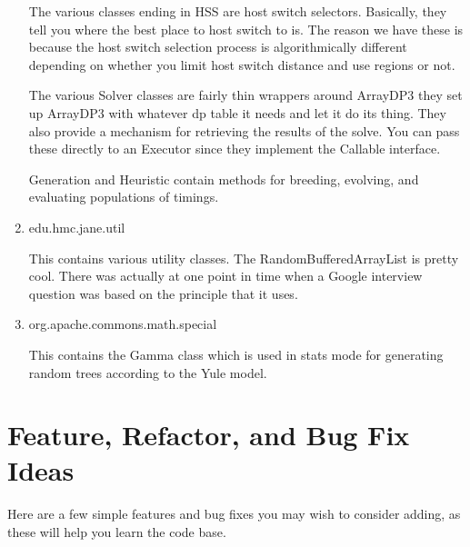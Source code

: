 \documentclass{article}
\begin{document}
\begin{enumerate}
The various classes ending in HSS are host switch selectors. Basically, they tell you where the best place to host switch to is. The reason we have these is because the host switch selection process is algorithmically different depending on whether you limit host switch distance and use regions or not. 

The various Solver classes are fairly thin wrappers around ArrayDP3 they set up ArrayDP3 with whatever dp table it needs and let it do its thing. They also provide a mechanism for retrieving the results of the solve. You can pass these directly to an Executor since they implement the Callable interface.

Generation and Heuristic contain methods for breeding, evolving, and evaluating populations of timings.

\item edu.hmc.jane.util

This contains various utility classes. The RandomBufferedArrayList is pretty cool. There was actually at one point in time when a Google interview question was based on the principle that it uses.

\item org.apache.commons.math.special

This contains the Gamma class which is used in stats mode for generating random trees according to the Yule model.

\end{enumerate}

\section{Feature, Refactor, and Bug Fix Ideas}

Here are a few simple features and bug fixes you may wish to consider adding, as these will help you learn the code base.
\end{document}

